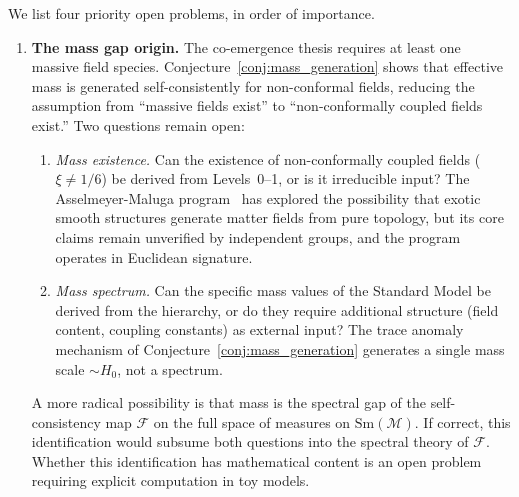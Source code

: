 \documentclass[12pt,a4paper]{article}
\theoremstyle{definition}
\theoremstyle{remark}
\begin{document}
We list four priority open problems, in order of importance.

\begin{enumerate}

\item \textbf{The mass gap origin.}
The co-emergence thesis requires at least one massive field species.
Conjecture~\ref{conj:mass_generation} shows that effective mass is
generated self-consistently for non-conformal fields, reducing the
assumption from ``massive fields exist'' to ``non-conformally coupled
fields exist.'' Two questions remain open:
\begin{enumerate}
\item[(a)] \emph{Mass existence.} Can the existence of non-conformally
coupled fields ($\xi \neq 1/6$) be derived from Levels~0--1, or is it
irreducible input? The Asselmeyer-Maluga
program~\cite{asselmeyer_maluga} has explored the possibility that
exotic smooth structures generate matter fields from pure topology, but
its core claims remain unverified by independent groups, and the
program operates in Euclidean signature.
\item[(b)] \emph{Mass spectrum.} Can the specific mass values of the
Standard Model be derived from the hierarchy, or do they require
additional structure (field content, coupling constants) as external
input? The trace anomaly mechanism of
Conjecture~\ref{conj:mass_generation} generates a single mass scale
$\sim H_0$, not a spectrum.
\end{enumerate}
A more radical possibility is that mass is the spectral gap of the
self-consistency map $\mathcal{F}$ on the full space of measures on
$\mathrm{Sm}(\mathcal{M})$. If correct, this identification would
subsume both questions into the spectral theory of $\mathcal{F}$. Whether
this identification has mathematical content is an open problem
requiring explicit computation in toy models.


\end{enumerate}
\end{document}
